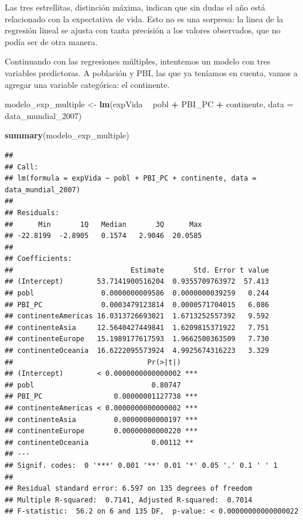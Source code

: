 \documentclass[spanish,]{book}
\newenvironment{Shaded}{\begin{snugshade}}{\end{snugshade}}
\newcommand{\DataTypeTok}[1]{\textcolor[rgb]{0.13,0.29,0.53}{#1}}
\newcommand{\DecValTok}[1]{\textcolor[rgb]{0.00,0.00,0.81}{#1}}
\newcommand{\KeywordTok}[1]{\textcolor[rgb]{0.13,0.29,0.53}{\textbf{#1}}}
\newcommand{\NormalTok}[1]{#1}
\newcommand{\OperatorTok}[1]{\textcolor[rgb]{0.81,0.36,0.00}{\textbf{#1}}}
\newcommand{\StringTok}[1]{\textcolor[rgb]{0.31,0.60,0.02}{#1}}
\begin{document}
Las tres estrellitas, distinción máxima, indican que sin dudas el año está relacionado con la expectativa de vida. Esto no es una sorpresa: la linea de la regresión lineal se ajusta con tanta precisión a los valores observados, que no podía ser de otra manera.

Continuando con las regresiones múltiples, intentemos un modelo con tres variables predictoras. A población y PBI, las que ya teníamos en cuenta, vamos a agregar una variable categórica: el continente.

\begin{Shaded}
\begin{Highlighting}[]
\NormalTok{modelo_exp_multiple <-}\StringTok{ }\KeywordTok{lm}\NormalTok{(expVida }\OperatorTok{~}\StringTok{ }\NormalTok{pobl }\OperatorTok{+}\StringTok{ }\NormalTok{PBI_PC }\OperatorTok{+}\StringTok{ }\NormalTok{continente, }\DataTypeTok{data =}\NormalTok{ data_mundial_}\DecValTok{2007}\NormalTok{)}

\KeywordTok{summary}\NormalTok{(modelo_exp_multiple)}
\end{Highlighting}
\end{Shaded}

\begin{verbatim}
## 
## Call:
## lm(formula = expVida ~ pobl + PBI_PC + continente, data = data_mundial_2007)
## 
## Residuals:
##      Min       1Q   Median       3Q      Max 
## -22.8199  -2.8905   0.1574   2.9046  20.0585 
## 
## Coefficients:
##                            Estimate       Std. Error t value
## (Intercept)        53.7141900516204  0.9355709763972  57.413
## pobl                0.0000000009586  0.0000000039259   0.244
## PBI_PC              0.0003479123814  0.0000571704015   6.086
## continenteAmericas 16.0313726693021  1.6713252557392   9.592
## continenteAsia     12.5640427449841  1.6209815371922   7.751
## continenteEurope   15.1989177617593  1.9662500363509   7.730
## continenteOceania  16.6222095573924  4.9925674316223   3.329
##                                Pr(>|t|)    
## (Intercept)        < 0.0000000000000002 ***
## pobl                            0.80747    
## PBI_PC                 0.00000001127738 ***
## continenteAmericas < 0.0000000000000002 ***
## continenteAsia         0.00000000000197 ***
## continenteEurope       0.00000000000220 ***
## continenteOceania               0.00112 ** 
## ---
## Signif. codes:  0 '***' 0.001 '**' 0.01 '*' 0.05 '.' 0.1 ' ' 1
## 
## Residual standard error: 6.597 on 135 degrees of freedom
## Multiple R-squared:  0.7141, Adjusted R-squared:  0.7014 
## F-statistic:  56.2 on 6 and 135 DF,  p-value: < 0.00000000000000022
\end{verbatim}
\end{document}
